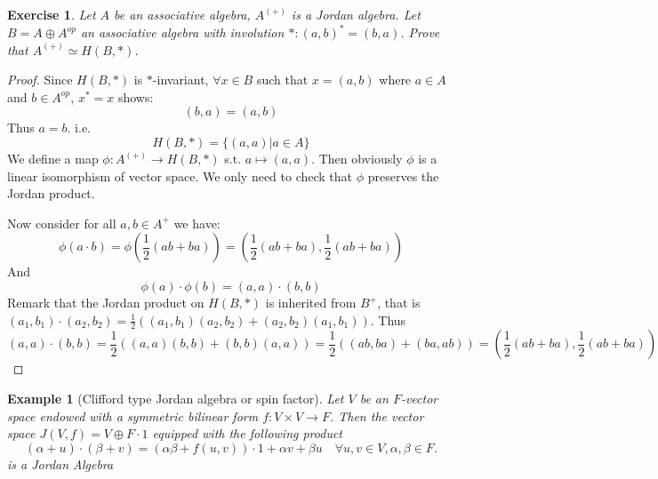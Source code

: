 \documentclass{article}
\newtheorem{example}[theorem]{Example}
\newtheorem{exercise}[theorem]{Exercise}
\begin{document}
\begin{exercise}
Let $ A $ be an associative algebra, $ A^{(+)} $ is a Jordan algebra. Let $ B=A\oplus A^{op}$ an associative algebra with involution $ * : (a,b)^*=(b,a)$. Prove that $ A^{(+)} \simeq H(B,*) $. 
\end{exercise}

\begin{proof} 
Since $ H(B, *) $ is $ * $-invariant, $ \forall x \in B $ such that $ x=(a,b) $ where $ a \in A $ and $ b \in A^{op} $, $ x^*=x $ shows:
\[
(b,a)=(a,b)
\] 
Thus $ a=b $. i.e.
\[
H(B,*)= \{ (a,a) | a \in A \}
\] 
We define a map $ \phi: A^{(+)} \rightarrow H(B,*) $ s.t. $ a \mapsto (a,a) $. Then obviously $ \phi $ is a linear isomorphism of vector space. We only need to check that $ \phi $ preserves the Jordan product.

Now consider for all $ a,b \in A^+ $ we have:
\[
\phi(a \cdot b)=\phi\left(\frac{1}{2}(ab+ba)\right)=\left(\frac{1}{2}(ab+ba),\frac{1}{2}(ab+ba)\right)
\]
And
\[
\phi(a) \cdot \phi(b)=(a,a)\cdot (b,b)
\]
Remark that the Jordan product on $ H(B,*) $ is inherited from $ B^+ $, that is $ (a_1, b_1) \cdot (a_2,b_2)=\frac{1}{2}((a_1, b_1)(a_2,b_2)+(a_2,b_2)(a_1, b_1)) $. Thus
\[
(a,a)\cdot (b,b)=\frac{1}{2}((a,a)(b,b)+(b,b)(a,a))=\frac{1}{2}((ab,ba)+(ba,ab))=\left(\frac{1}{2}(ab+ba),\frac{1}{2}(ab+ba)\right)
\]   
\end{proof}

\begin{example}[Clifford type Jordan algebra or spin factor] 
 Let $V$ be an $ F $-vector space endowed with a symmetric bilinear form $f: V \times V \to F$. Then the vector space $J(V,f) = V \oplus F \cdot 1$ equipped with the following product
\[
  ( \alpha+ u) \cdot ( \beta+ v) = (\alpha \beta + f(u,v) )\cdot 1 + \alpha v +\beta u \quad \forall  u,v \in V, \alpha, \beta \in F.
\]
is a Jordan Algebra
\end{example}
\end{document}
